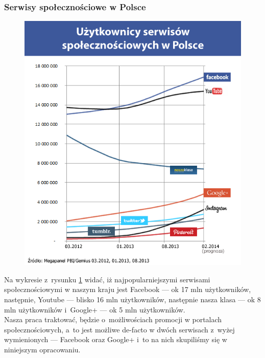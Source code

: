 
\subsubsection{Serwisy społecznościowe w Polsce}

\begin{figure}[!h]
\centering
    \scalebox{0.5}
    {
        \includegraphics{images/lukasz/analiza.png}
    }
    \label{fig:uzytkownicy-mediow-spolecznosciowych-w-polsce}
\end{figure}


Na wykresie z~rysunku \ref{fig:uzytkownicy-mediow-spolecznosciowych-w-polsce} widać, iż najpopularniejszymi serwisami społecznościowymi w naszym kraju jest Facebook --- ok 17 mln użytkowników, następnie, Youtube --- blisko 16 mln użytkowników, następnie nasza klasa --- ok 8 mln użytkowników i~Google+ --- ok 5 mln użytkowników.\\

Nasza praca traktować, będzie o~możliwościach promocji w portalach społecznościowych, a~to jest możliwe de-facto w dwóch serwisach z~wyżej wymienionych --- Facebook oraz Google+ i~to na nich skupiliśmy się w niniejszym opracowaniu.

